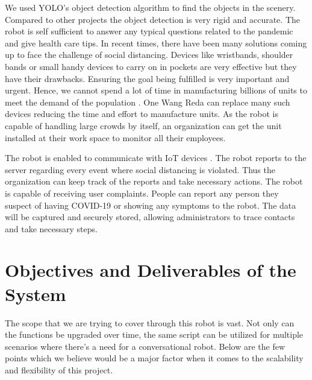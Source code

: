\documentclass[AMA,STIX1COL]{WileyNJD-v2}
\begin{document}

We used YOLO’s object detection algorithm to find the objects in the scenery. Compared to other projects the object detection is very rigid and accurate. The robot is self sufficient to answer any typical questions related to the pandemic and give health care tips. In recent times, there have been many solutions coming up to face the challenge of social distancing. Devices like wristbands, shoulder bands or small handy devices to carry on in pockets are very effective \cite{b9} but they have their drawbacks. Ensuring the goal being fulfilled is very important and urgent. Hence, we cannot spend a lot of time in manufacturing billions of units to meet the demand of the population \cite{b10}. One Wang Reda can replace many such devices reducing the time and effort to manufacture units. As the robot is capable of handling large crowds by itself, an organization can get the unit installed at their work space to monitor all their employees.

The robot is enabled to communicate with IoT devices \cite{b26}. The robot reports to the server regarding every event where social distancing is violated. Thus the organization can keep track of the reports and take necessary actions. The robot is capable of receiving user complaints. People can report any person they suspect of having COVID-19 or showing any symptoms to the robot. The data will be captured and securely stored, allowing administrators to trace contacts and take necessary steps.



\section{Objectives and Deliverables of the System}  \label{boba} 

The scope that we are trying to cover through this robot is vast. Not only can the functions be upgraded over time, the same script can be utilized for multiple scenarios where there's a need for a conversational robot.  Below are the few points which we believe would be a major factor when it comes to the scalability and flexibility of this project.
\end{document}
